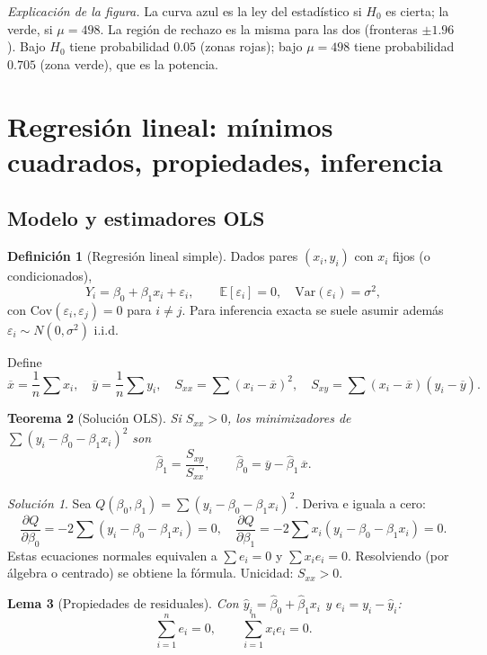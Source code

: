 \documentclass[11pt]{article}
\theoremstyle{plain}
\newtheorem{theorem}{Teorema}[section]
\newtheorem{lemma}[theorem]{Lema}
\theoremstyle{definition}
\newtheorem{definition}[theorem]{Definición}
\theoremstyle{remark}
\theoremstyle{solstyle}
\newtheorem*{solution}{Solución}
\newcommand{\E}{\mathbb{E}}
\newcommand{\Var}{\mathrm{Var}}
\newcommand{\Cov}{\mathrm{Cov}}
\newcommand{\1}{\mathbbm{1}}
\newcommand{\xbar}{\overline{x}}
\newcommand{\ybar}{\overline{y}}
\begin{document}
\noindent\textit{Explicación de la figura.} La curva azul es la ley del estadístico si $H_0$ es cierta; la verde, si $\mu=498$. La región de rechazo es la misma para las dos (fronteras $\pm1.96$). Bajo $H_0$ tiene probabilidad $0.05$ (zonas rojas); bajo $\mu=498$ tiene probabilidad $0.705$ (zona verde), que es la potencia.

\section{Regresión lineal: mínimos cuadrados, propiedades, inferencia}

\subsection{Modelo y estimadores OLS}

\begin{definition}[Regresión lineal simple]
Dados pares $(x_i,y_i)$ con $x_i$ fijos (o condicionados),
\[
Y_i=\beta_0+\beta_1 x_i+\varepsilon_i,\qquad \E[\varepsilon_i]=0,\quad \Var(\varepsilon_i)=\sigma^2,
\]
con $\Cov(\varepsilon_i,\varepsilon_j)=0$ para $i\neq j$. Para inferencia exacta se suele asumir además
$\varepsilon_i\sim N(0,\sigma^2)$ i.i.d.
\end{definition}

Define
\[
\xbar=\frac1n\sum x_i,\quad \ybar=\frac1n\sum y_i,\quad
S_{xx}=\sum (x_i-\xbar)^2,\quad S_{xy}=\sum (x_i-\xbar)(y_i-\ybar).
\]

\begin{theorem}[Solución OLS]\label{thm:OLS}
Si $S_{xx}>0$, los minimizadores de $\sum (y_i-\beta_0-\beta_1 x_i)^2$ son
\[
\widehat\beta_1=\frac{S_{xy}}{S_{xx}},\qquad \widehat\beta_0=\ybar-\widehat\beta_1\,\xbar.
\]
\end{theorem}

\begin{solution}
Sea $Q(\beta_0,\beta_1)=\sum (y_i-\beta_0-\beta_1 x_i)^2$.
Deriva e iguala a cero:
\[
\frac{\partial Q}{\partial \beta_0}=-2\sum (y_i-\beta_0-\beta_1 x_i)=0,\quad
\frac{\partial Q}{\partial \beta_1}=-2\sum x_i(y_i-\beta_0-\beta_1 x_i)=0.
\]
Estas ecuaciones normales equivalen a $\sum e_i=0$ y $\sum x_i e_i=0$.
Resolviendo (por álgebra o centrado) se obtiene la fórmula. Unicidad: $S_{xx}>0$.
\end{solution}

\begin{lemma}[Propiedades de residuales]\label{lem:residuals}
Con $\widehat y_i=\widehat\beta_0+\widehat\beta_1 x_i$ y $e_i=y_i-\widehat y_i$:
\[
\sum_{i=1}^n e_i=0,\qquad \sum_{i=1}^n x_i e_i=0.
\]
\end{lemma}
\end{document}
